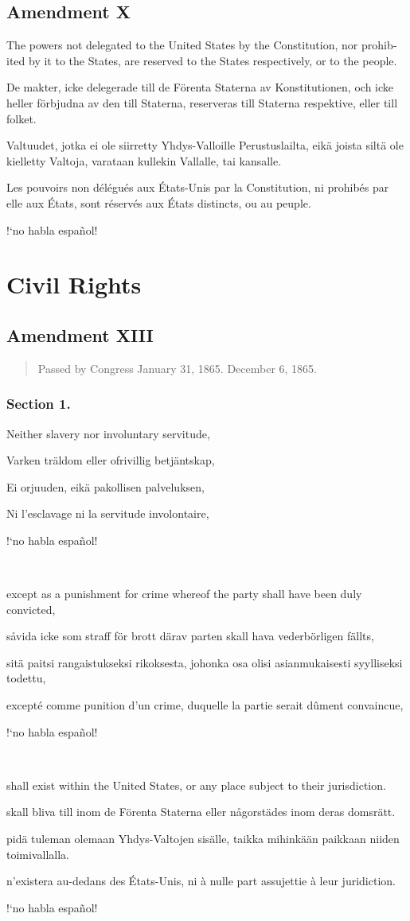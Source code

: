 \documentclass[a4paper,landscape,10pt]{article}
\newcommand{\tblock}[5]{\noindent\begin{minipage}[t]{0.18\textwidth}\foreignlanguage{english}{#1}\end{minipage}\hskip 0.025\textwidth\begin{minipage}[t]{0.18\textwidth}\foreignlanguage{swedish}{#2}\end{minipage}\hskip 0.025\textwidth\begin{minipage}[t]{0.18\textwidth}\foreignlanguage{finnish}{#3}\end{minipage}\hskip 0.025\textwidth\begin{minipage}[t]{0.18\textwidth}\foreignlanguage{french}{#4}\end{minipage}\hskip 0.025\textwidth\begin{minipage}[t]{0.18\textwidth}\foreignlanguage{spanish}{#5}\end{minipage}}
\begin{document}
\subsection*{Amendment X}
\tblock
{The powers not delegated to the United States by the Constitution, nor prohibited by it to the States, are reserved to the States respectively, or to the people.}
{De makter, icke delegerade till de Förenta Staterna av Konstitutionen, och icke heller förbjudna av den till Staterna, reserveras till Staterna respektive, eller till folket.}
{Valtuudet, jotka ei ole siirretty Yhdys-Valloille Perustuslailta, eikä joista siltä ole kielletty Valtoja, varataan kullekin Vallalle, tai kansalle.}
{Les pouvoirs non délégués aux États-Unis par la Constitution, ni prohibés par elle aux États, sont réservés aux États distincts, ou au peuple.}
{!`no habla español!}


\section*{Civil Rights}
\subsection*{Amendment XIII}
\begin{quote}\small
	Passed by Congress January 31, 1865.  December 6, 1865.
\end{quote}
\subsubsection*{Section 1.}
\tblock
{Neither slavery nor involuntary servitude,}
{Varken träldom eller ofrivillig betjäntskap,}
{Ei orjuuden, eikä pakollisen palveluksen,}
{Ni l'esclavage ni la servitude involontaire,}
{!`no habla español!}

~

\tblock
{except as a punishment for crime whereof the party shall have been duly convicted,}
{såvida icke som straff för brott därav parten skall hava vederbörligen fällts,}
{sitä paitsi rangaistukseksi rikoksesta, johonka osa olisi asianmukaisesti syylliseksi todettu,}
{excepté comme punition d'un crime, duquelle la partie serait dûment convaincue,}
{!`no habla español!}

~

\tblock
{shall \gls{exist} within the United States, or any place subject to their jurisdiction.}
{skall bliva till inom de Förenta Staterna eller någorstädes inom deras domsrätt.}
{pidä tuleman olemaan Yhdys-Valtojen sisälle, taikka mihinkään paikkaan niiden toimivallalla.}
{n'existera au-dedans des États-Unis, ni à nulle part assujettie à leur juridiction.}
{!`no habla español!}
\end{document}
